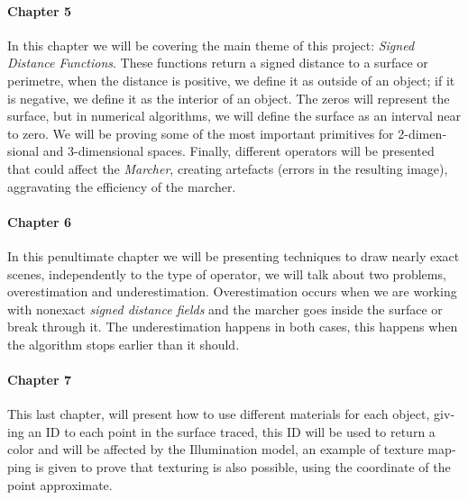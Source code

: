 \begin{otherlanguage}{english}
\paragraph{Chapter 5} In this chapter we will be covering the main theme of this project: \textit{Signed Distance Functions}. These functions return a signed distance to a surface or perimetre, when the distance is positive, we define it as outside of an object; if it is negative, we define it as the interior of an object. The zeros will represent the surface, but in numerical algorithms, we will define the surface as an interval near to zero. We will be proving some of the most important primitives for 2-dimensional and 3-dimensional spaces. Finally, different operators will be presented that could affect the \textit{Marcher}, creating artefacts (errors in the resulting image), aggravating the efficiency of the marcher.

\paragraph{Chapter 6} In this penultimate chapter we will be presenting techniques to draw nearly exact scenes, independently to the type of operator, we will talk about two problems, overestimation and underestimation. Overestimation occurs when we are working with nonexact \textit{signed distance fields} and the marcher goes inside the surface or break through it. The underestimation happens in both cases, this happens when the algorithm stops earlier than it should.

\paragraph{Chapter 7} This last chapter, will present how to use different materials for each object, giving an ID to each point in the surface traced, this ID will be used to return a color and will be affected by the Illumination model, an example of texture mapping is given to prove that texturing is also possible, using the coordinate of the point approximate.

\vspace{0.7cm}

\end{otherlanguage}

